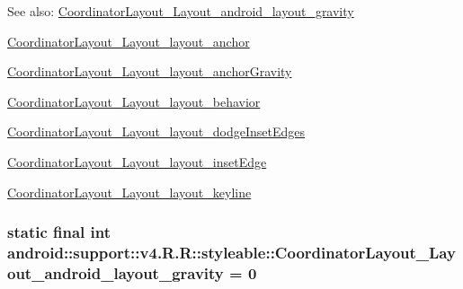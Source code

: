 \begin{Desc}
\item[See also:]\hyperlink{classandroid_1_1support_1_1v4_1_1_r_1_1styleable_65760d32d26a5a8a75ef8cc2e6386db7}{CoordinatorLayout\_\-Layout\_\-android\_\-layout\_\-gravity} 

\hyperlink{classandroid_1_1support_1_1v4_1_1_r_1_1styleable_b35a32b00f117fac198051858264bb36}{CoordinatorLayout\_\-Layout\_\-layout\_\-anchor} 

\hyperlink{classandroid_1_1support_1_1v4_1_1_r_1_1styleable_f6e5589929bcbc99b0bcbeb23e048b95}{CoordinatorLayout\_\-Layout\_\-layout\_\-anchorGravity} 

\hyperlink{classandroid_1_1support_1_1v4_1_1_r_1_1styleable_982d12aa414414e1e0475e69c9587a1c}{CoordinatorLayout\_\-Layout\_\-layout\_\-behavior} 

\hyperlink{classandroid_1_1support_1_1v4_1_1_r_1_1styleable_a57573ce33cb7197819b20094f59046d}{CoordinatorLayout\_\-Layout\_\-layout\_\-dodgeInsetEdges} 

\hyperlink{classandroid_1_1support_1_1v4_1_1_r_1_1styleable_b928d3f0b1a126bfb85b144df1690720}{CoordinatorLayout\_\-Layout\_\-layout\_\-insetEdge} 

\hyperlink{classandroid_1_1support_1_1v4_1_1_r_1_1styleable_b7235d7fb22787830b44526e15a68fe4}{CoordinatorLayout\_\-Layout\_\-layout\_\-keyline} \end{Desc}
\hypertarget{classandroid_1_1support_1_1v4_1_1_r_1_1styleable_65760d32d26a5a8a75ef8cc2e6386db7}{
\subsubsection[{CoordinatorLayout\_\-Layout\_\-android\_\-layout\_\-gravity}]{\setlength{\rightskip}{0pt plus 5cm}static final int android::support::v4.R.R::styleable::CoordinatorLayout\_\-Layout\_\-android\_\-layout\_\-gravity = 0}}
\label{classandroid_1_1support_1_1v4_1_1_r_1_1styleable_65760d32d26a5a8a75ef8cc2e6386db7}


